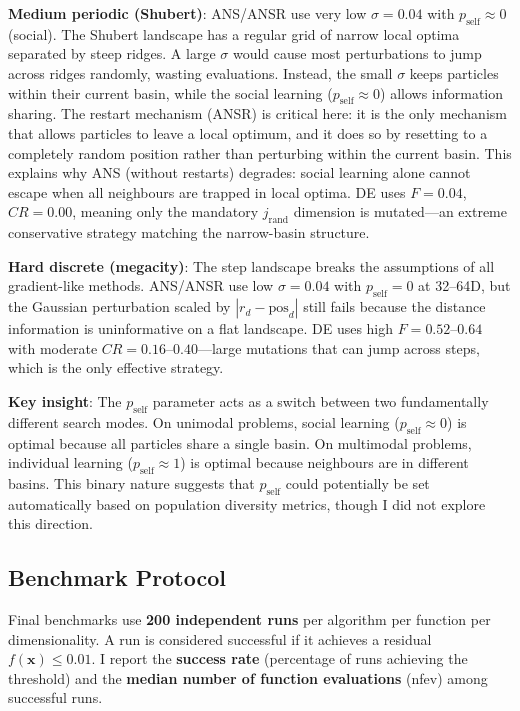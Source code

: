 \documentclass[11pt,a4paper]{article}
\begin{document}
\textbf{Medium periodic (Shubert)}: ANS/ANSR use very low $\sigma = 0.04$ with $p_{\text{self}} \approx 0$ (social). The Shubert landscape has a regular grid of narrow local optima separated by steep ridges. A large $\sigma$ would cause most perturbations to jump across ridges randomly, wasting evaluations. Instead, the small $\sigma$ keeps particles within their current basin, while the social learning ($p_{\text{self}} \approx 0$) allows information sharing. The restart mechanism (ANSR) is critical here: it is the only mechanism that allows particles to leave a local optimum, and it does so by resetting to a completely random position rather than perturbing within the current basin. This explains why ANS (without restarts) degrades: social learning alone cannot escape when all neighbours are trapped in local optima. DE uses $F = 0.04$, $CR = 0.00$, meaning only the mandatory $j_{\text{rand}}$ dimension is mutated---an extreme conservative strategy matching the narrow-basin structure.

\textbf{Hard discrete (megacity)}: The step landscape breaks the assumptions of all gradient-like methods. ANS/ANSR use low $\sigma = 0.04$ with $p_{\text{self}} = 0$ at 32--64D, but the Gaussian perturbation scaled by $|r_d - \text{pos}_d|$ still fails because the distance information is uninformative on a flat landscape. DE uses high $F = 0.52$--$0.64$ with moderate $CR = 0.16$--$0.40$---large mutations that can jump across steps, which is the only effective strategy.

\textbf{Key insight}: The $p_{\text{self}}$ parameter acts as a switch between two fundamentally different search modes. On unimodal problems, social learning ($p_{\text{self}} \approx 0$) is optimal because all particles share a single basin. On multimodal problems, individual learning ($p_{\text{self}} \approx 1$) is optimal because neighbours are in different basins. This binary nature suggests that $p_{\text{self}}$ could potentially be set automatically based on population diversity metrics, though I did not explore this direction.

\subsection{Benchmark Protocol}

Final benchmarks use \textbf{200 independent runs} per algorithm per function per dimensionality. A run is considered successful if it achieves a residual $f(\mathbf{x}) \leq 0.01$. I report the \textbf{success rate} (percentage of runs achieving the threshold) and the \textbf{median number of function evaluations} (nfev) among successful runs.
\end{document}
